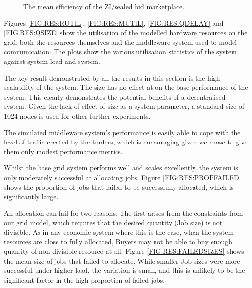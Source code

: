 \begin{figure}[h] 
  \centering
  \caption{The mean efficiency of the ZI/sealed bid marketplace.}
  \label{FIG:RES:EFFICIENCY}
\end{figure}


Figures \ref{FIG:RES:RUTIL}, \ref{FIG:RES:MUTIL}, \ref{FIG:RES:QDELAY} and 
\ref{FIG:RES:QSIZE} show the utilisation of the modelled hardware
resources on the grid, both the resources themselves and the middleware system
used to model communication. The plots show the various utilisation statistics
of the system against system load and system.

The key result demonstrated by all the results in this section is the high
scalability of the system.  The size has no effect at on the base performance of
the system. This clearly demonstrates the potential benefits of a decentralised
system.  Given the lack of effect of size as a system parameter, a standard
size of 1024 nodes is used for other further experiments.

The simulated middleware system's performance is easily able to cope with the
level of traffic created by the traders, which is encouraging given we chose to
give them only modest performance metrics.



Whilst the base grid system performs well and scales excellently, the system is
only moderately successful at allocating jobs. Figure \ref{FIG:RES:PROPFAILED}
shows the proportion of jobs that failed to be successfully allocated, which is
significantly large. 


An allocation can fail for two reasons. The first arises from the constraints
from our grid model, which requires that the desired quantity (Job size) is not
divisible. As in any economic system where this is the case, when the system
resources are close to fully allocated,  Buyers may not be able to buy enough
quantity of non-divisible resource at all.  Figure \ref{FIG:RES:FAILEDSIZES}
shows the mean size of jobs that failed to allocate.  While smaller Job sizes
were more successful under higher load, the variation is small, and this is
unlikely to be the significant factor in the high proportion of failed jobs.

